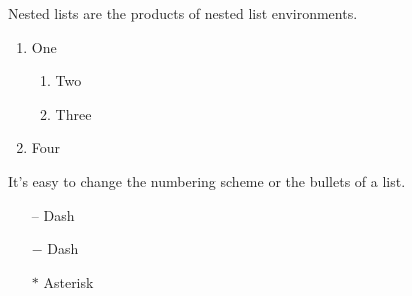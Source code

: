 \documentclass[11pt]{article}  %
\begin{document}
    \noindent Nested lists are the products of nested list environments.

    \begin{enumerate}
      \item One
      \begin{enumerate}
      	\item Two
        \item Three
      \end{enumerate}
      \item Four
    \end{enumerate}

    \noindent It's easy to change the numbering scheme or the bullets of a list.

    \begin{itemize}
      \item[--] Dash
      \item[$-$] Dash
      \item[$\ast$] Asterisk
    \end{itemize}


  \newpage
  \begin{appendix}  %
    \listoffigures  %
    \listoftables   %
  \end{appendix}


  \newpage
  \printbibliography
\end{document}
